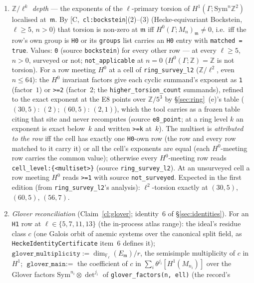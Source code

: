 \documentclass[11pt]{article}
\theoremstyle{remark}
\newcommand{\F}{\mathbb{F}}
\newcommand{\Z}{\mathbb{Z}}
\newcommand{\Sym}{\mathrm{Sym}}
\newcommand{\Ga}{\Gamma}
\newcommand{\Fl}{\F_\ell}
\newcommand{\m}{\mathfrak{m}}
\newcommand{\Mn}{M_n}
\newcommand{\HA}[1]{[C,~\texttt{#1}]}      %
\begin{document}
\begin{enumerate}[label=(\alph*)]
\begin{enumerate}[label=(d\arabic*)]
    \texttt{not\_computed} where no \texttt{THETA\_IMAGE} line exists (e.g.\ a second-edition cell
    WP-6's producer has not run on).
  \item \emph{$\Z/\ell^k$ depth} --- the exponents of the $\ell$-primary torsion of
    $H^1(\Ga;\Sym^n\Z^2)$ localised at~$\m$. By \HA{cl:bockstein}(2)--(3) (Hecke-equivariant
    Bockstein, $\ell\ge5$, $n>0$) that torsion is non-zero at $\m$ iff $H^0(\Ga;\Mn)_\m\ne0$,
    i.e.\ iff the row's own group is \texttt{H0} or its \texttt{groups} list carries an \texttt{H0}
    entry with \texttt{matched = true}. Values: \texttt{0} (source \texttt{bockstein}) for every
    other row --- at every $\ell\ge5$, $n>0$, surveyed or not; \texttt{not\_applicable} at $n=0$
    ($H^0(\Ga;\Z)=\Z$ is not torsion). For a row meeting $H^0$ at a cell of
    \texttt{ring\_survey\_l2} ($\Z/\ell^2$, even $n\le64$): the $H^0$ invariant factors give each
    cyclic summand's exponent as \texttt{1} (factor~$1$) or \texttt{>=2} (factor~$2$; the
    \texttt{higher\_torsion\_count} summands), refined to the exact exponent at the E8 points over
    $\Z/5^3$ by \S\ref{sec:ring}~(e)'s table ($(30,5)$: $(2)$; $(60,5)$: $(2,1)$), which the tool
    carries as a frozen table citing that site and never recomputes (source \texttt{e8\_point}; at a
    ring level $k$ an exponent is exact below~$k$ and written \texttt{>=k} at~$k$). The multiset is
    \emph{attributed to the row} iff the cell has exactly one \texttt{H0}-own row (the row and every
    row matched to it carry it) or all the cell's exponents are equal (each $H^0$-meeting row
    carries the common value); otherwise every $H^0$-meeting row reads
    \texttt{cell\_level:\{<multiset>\}} (source \texttt{ring\_survey\_l2}). At an unsurveyed cell a
    row meeting $H^0$ reads \texttt{>=1} with source \texttt{not\_surveyed}. Expected in the first
    edition (from \texttt{ring\_survey\_l2}'s analysis): $\ell^2$-torsion exactly at $(30,5)$,
    $(60,5)$, $(56,7)$.
  \item \emph{Glover reconciliation} (Claim~\ref{cl:glover}; identity~6 of
    \S\ref{sec:identities}). For an \texttt{H1} row at $\ell\in\{5,7,11,13\}$ (the in-process
    atlas range): the ideal's residue class $c$ (one Galois orbit of anemic systems over the
    canonical split field, as \texttt{HeckeIdentityCertificate} item~6 defines it);
    $\texttt{glover\_multiplicity}:=\dim_{\Fl}(E_\m)/r$, the semisimple multiplicity of $c$ in $H^1$;
    $\texttt{glover\_main}:=$ the coefficient of $c$ in $\sum_i\theta^{j_i}[H^1(M_{n_i})]$ over the
    Glover factors $\Sym^{n_i}\otimes\det^{j_i}$ of \texttt{glover\_factors(n, ell)} (the record's

\end{enumerate}
\end{enumerate}
\end{document}
